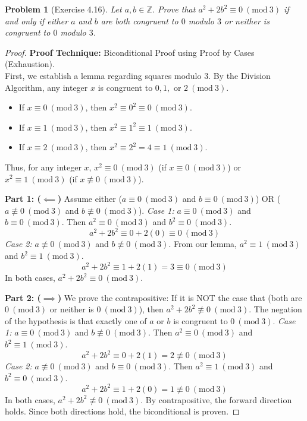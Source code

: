 \documentclass[11pt]{article}
\newtheorem{problem}{Problem}
\newcommand{\Z}{\mathbb{Z}}
\newcommand{\modulo}[1]{\ (\mathrm{mod}\ #1)}
\begin{document}
\begin{problem}[Exercise 4.16]
Let $a, b \in \Z$. Prove that $a^2 + 2b^2 \equiv 0 \modulo{3}$ if and only if either $a$ and $b$ are both congruent to $0$ modulo $3$ or neither is congruent to $0$ modulo $3$.
\end{problem}
\begin{proof}
\textbf{Proof Technique:} Biconditional Proof using Proof by Cases (Exhaustion). \\
First, we establish a lemma regarding squares modulo 3. By the Division Algorithm, any integer $x$ is congruent to $0, 1,$ or $2 \modulo{3}$.
\begin{itemize}
    \item If $x \equiv 0 \modulo{3}$, then $x^2 \equiv 0^2 \equiv 0 \modulo{3}$.
    \item If $x \equiv 1 \modulo{3}$, then $x^2 \equiv 1^2 \equiv 1 \modulo{3}$.
    \item If $x \equiv 2 \modulo{3}$, then $x^2 \equiv 2^2 = 4 \equiv 1 \modulo{3}$.
\end{itemize}
Thus, for any integer $x$, $x^2 \equiv 0 \modulo{3}$ (if $x \equiv 0 \modulo{3}$) or $x^2 \equiv 1 \modulo{3}$ (if $x \not\equiv 0 \modulo{3}$).

\textbf{Part 1: ($\impliedby$)} Assume either ($a \equiv 0 \modulo{3}$ and $b \equiv 0 \modulo{3}$) OR ($a \not\equiv 0 \modulo{3}$ and $b \not\equiv 0 \modulo{3}$).
\textit{Case 1:} $a \equiv 0 \modulo{3}$ and $b \equiv 0 \modulo{3}$.
Then $a^2 \equiv 0 \modulo{3}$ and $b^2 \equiv 0 \modulo{3}$.
\[ a^2 + 2b^2 \equiv 0 + 2(0) \equiv 0 \modulo{3} \]
\textit{Case 2:} $a \not\equiv 0 \modulo{3}$ and $b \not\equiv 0 \modulo{3}$.
From our lemma, $a^2 \equiv 1 \modulo{3}$ and $b^2 \equiv 1 \modulo{3}$.
\[ a^2 + 2b^2 \equiv 1 + 2(1) = 3 \equiv 0 \modulo{3} \]
In both cases, $a^2 + 2b^2 \equiv 0 \modulo{3}$.

\textbf{Part 2: ($\implies$)} We prove the contrapositive: If it is NOT the case that (both are $0 \modulo{3}$ or neither is $0 \modulo{3}$), then $a^2 + 2b^2 \not\equiv 0 \modulo{3}$.
The negation of the hypothesis is that exactly one of $a$ or $b$ is congruent to $0 \modulo{3}$.
\textit{Case 1:} $a \equiv 0 \modulo{3}$ and $b \not\equiv 0 \modulo{3}$.
Then $a^2 \equiv 0 \modulo{3}$ and $b^2 \equiv 1 \modulo{3}$.
\[ a^2 + 2b^2 \equiv 0 + 2(1) = 2 \not\equiv 0 \modulo{3} \]
\textit{Case 2:} $a \not\equiv 0 \modulo{3}$ and $b \equiv 0 \modulo{3}$.
Then $a^2 \equiv 1 \modulo{3}$ and $b^2 \equiv 0 \modulo{3}$.
\[ a^2 + 2b^2 \equiv 1 + 2(0) = 1 \not\equiv 0 \modulo{3} \]
In both cases, $a^2 + 2b^2 \not\equiv 0 \modulo{3}$. By contrapositive, the forward direction holds.
Since both directions hold, the biconditional is proven.
\end{proof}
\end{document}
